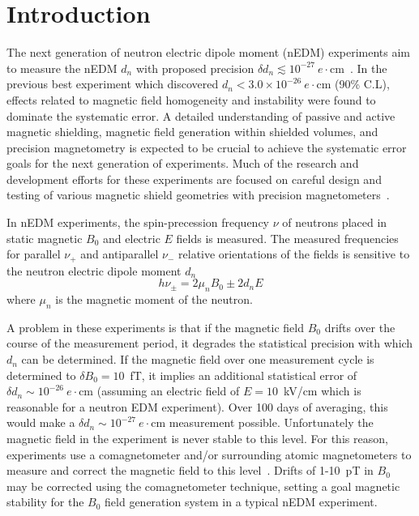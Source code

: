 \documentclass[review,number,sort&compress]{elsarticle}
\begin{document}
\linenumbers

\section{Introduction}

The next generation of neutron electric dipole moment (nEDM)
experiments aim to measure the nEDM $d_n$ with proposed precision
$\delta d_n\lesssim
10^{-27}~e\cdot$cm~\cite{bib:nedm2,bib:nedm2.5,bib:nedm3,bib:nedm3.5,bib:nedm5,bib:nedm6,bib:nedm6.5,bib:nedmtriumf}.
In the previous best experiment \cite{bib:baker,bib:pendlebury} which
discovered $d_n<3.0\times 10^{-26}~e\cdot$cm (90\% C.L), effects
related to magnetic field homogeneity and instability were found to
dominate the systematic error.  A detailed understanding of passive
and active magnetic shielding, magnetic field generation within
shielded volumes, and precision magnetometry is expected to be crucial
to achieve the systematic error goals for the next generation of
experiments.  Much of the research and development efforts for these
experiments are focused on careful design and testing of various
magnetic shield geometries with precision
magnetometers~\cite{bib:brys,bib:afach,bib:fierlingerroom,bib:sturmthesis,bib:patton}.

In nEDM experiments, the spin-precession frequency $\nu$ of neutrons
placed in static magnetic $B_0$ and electric $E$ fields is measured.
The measured frequencies for parallel $\nu_+$ and antiparallel $\nu_-$
relative orientations of the fields is sensitive to the neutron
electric dipole moment $d_n$
\begin{equation}
h\nu_\pm=2\mu_nB_0\pm 2d_nE
\end{equation}
where $\mu_n$ is the magnetic moment of the neutron.

A problem in these experiments is that if the magnetic field $B_0$
drifts over the course of the measurement period, it degrades the
statistical precision with which $d_n$ can be determined.  If the
magnetic field over one measurement cycle is determined to $\delta
B_0=10$~fT, it implies an additional statistical error of $\delta
d_n\sim 10^{-26}~e\cdot$cm (assuming an electric field of $E=10$~kV/cm
which is reasonable for a neutron EDM experiment).  Over 100 days of
averaging, this would make a $\delta d_n\sim 10^{-27}~e\cdot$cm
measurement possible.  Unfortunately the magnetic field in the
experiment is never stable to this level.  For this reason,
experiments use a comagnetometer and/or surrounding atomic
magnetometers to measure and correct the magnetic field to this
level~\cite{bib:baker,bib:brys,bib:afach}.  Drifts of 1-10~pT in $B_0$
may be corrected using the comagnetometer technique, setting a goal
magnetic stability for the $B_0$ field generation system in a typical
nEDM experiment.
\end{document}
